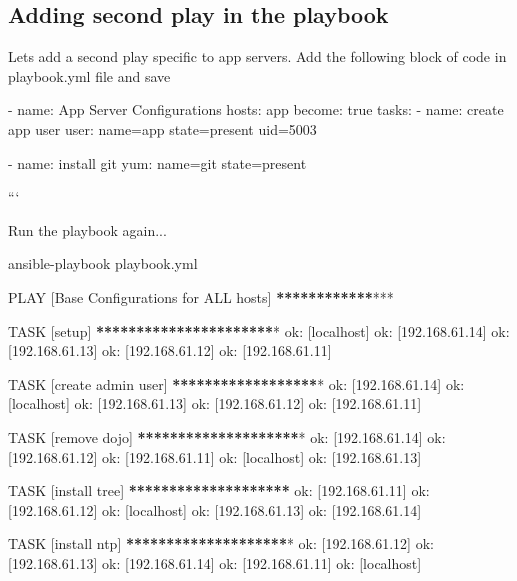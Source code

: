 \subsection{Adding second play in the playbook}

Lets add a second play specific to app servers. Add the following block of code in playbook.yml file and save   

\begin{code}
- name: App Server Configurations
  hosts: app
  become: true
  tasks:
    - name: create app user
      user: name=app state=present uid=5003

    - name: install git
      yum:  name=git  state=present

```  

Run the playbook again...  

\end{code}
ansible-playbook playbook.yml
\begin{code}

\end{code}

PLAY [Base Configurations for ALL hosts] \textbf{**}\textbf{**}\textbf{**}\textbf{**}\textbf{**}\textbf{**}***

TASK [setup] \textbf{**}\textbf{**}\textbf{**}\textbf{**}\textbf{**}\textbf{**}\textbf{**}\textbf{**}\textbf{**}\textbf{**}\textbf{**}*
ok: [localhost]
ok: [192.168.61.14]
ok: [192.168.61.13]
ok: [192.168.61.12]
ok: [192.168.61.11]

TASK [create admin user] \textbf{**}\textbf{**}\textbf{**}\textbf{**}\textbf{**}\textbf{**}\textbf{**}\textbf{**}\textbf{**}*
ok: [192.168.61.14]
ok: [localhost]
ok: [192.168.61.13]
ok: [192.168.61.12]
ok: [192.168.61.11]

TASK [remove dojo] \textbf{**}\textbf{**}\textbf{**}\textbf{**}\textbf{**}\textbf{**}\textbf{**}\textbf{**}\textbf{**}\textbf{**}*
ok: [192.168.61.14]
ok: [192.168.61.12]
ok: [192.168.61.11]
ok: [localhost]
ok: [192.168.61.13]

TASK [install tree] \textbf{**}\textbf{**}\textbf{**}\textbf{**}\textbf{**}\textbf{**}\textbf{**}\textbf{**}\textbf{**}\textbf{**}
ok: [192.168.61.11]
ok: [192.168.61.12]
ok: [localhost]
ok: [192.168.61.13]
ok: [192.168.61.14]

TASK [install ntp] \textbf{**}\textbf{**}\textbf{**}\textbf{**}\textbf{**}\textbf{**}\textbf{**}\textbf{**}\textbf{**}\textbf{**}*
ok: [192.168.61.12]
ok: [192.168.61.13]
ok: [192.168.61.14]
ok: [192.168.61.11]
ok: [localhost]

